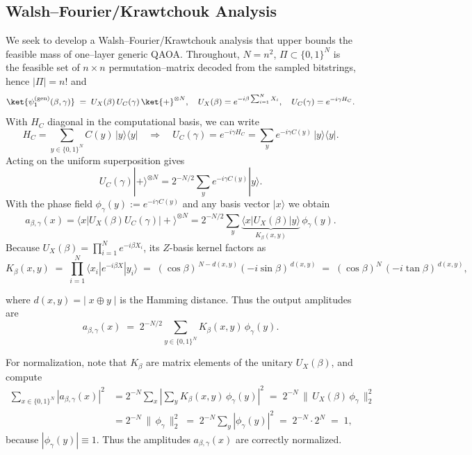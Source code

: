 \documentclass[a4paper,onecolumn,11pt,unpublished]{quantumarticle}
\theoremstyle{remark}
\begin{document}
\subsection{Walsh–Fourier/Krawtchouk Analysis}
We seek to develop a Walsh–Fourier/Krawtchouk analysis that upper bounds the feasible mass of one–layer generic QAOA. Throughout, $N=n^2$, $\Pi\subset\{0,1\}^N$ is the feasible set of $n\times n$ permutation–matrix decoded from the sampled bitstrings, hence $|\Pi|=n!$ and 
\[
  \ket{\psi_1^{\mathrm{(gen)}}(\beta,\gamma)}
  \;=\; U_X(\beta)\,U_C(\gamma)\,\ket{+}^{\otimes N},
  \quad
  U_X(\beta) = e^{-i\beta\sum_{i=1}^N X_i},\quad
  U_C(\gamma)=e^{-i\gamma H_C}.
\]
With $H_C$ diagonal in the computational basis, we can write
\[
  H_C=\sum_{y\in\{0,1\}^N} C(y)\,|y\rangle\!\langle y|
  \quad\Rightarrow\quad
  U_C(\gamma)=e^{-i\gamma H_C}
  =\sum_{y} e^{-i\gamma C(y)}\,|y\rangle\!\langle y|.
\]
Acting on the uniform superposition gives
\[
  U_C(\gamma)|+\rangle^{\otimes N}
  =2^{-N/2}\sum_{y} e^{-i\gamma C(y)} |y\rangle.
\]
With the phase field $\phi_\gamma(y):=e^{-i\gamma C(y)}$  and any basis vector $|x\rangle$ we obtain
\[
  a_{\beta,\gamma}(x)
  =\langle x|U_X(\beta)U_C(\gamma)|+\rangle^{\otimes N}
  =2^{-N/2}\sum_{y} \underbrace{\langle x|U_X(\beta)|y\rangle}_{K_\beta(x,y)}\,\phi_\gamma(y).
\]
Because $U_X(\beta)=\prod_{i=1}^N e^{-i\beta X_i}$, its $Z$-basis kernel factors as
\begin{equation}
\label{eq:kb}
  K_\beta(x,y)
  \;=\; \prod_{i=1}^N \langle x_i|e^{-i\beta X}|y_i\rangle
  \;=\; (\cos\beta)^{\,N-d(x,y)}(-i\sin\beta)^{\,d(x,y)}
  \;=\; (\cos\beta)^{N}\,(-i\tan\beta)^{\,d(x,y)},
\end{equation}

where $d(x,y)=|\;x\oplus y\;|$ is the Hamming distance.  Thus the output amplitudes are
\begin{equation}
\label{eq:prob_def}
  a_{\beta,\gamma}(x)
  \;=\; 2^{-N/2}\sum_{y\in\{0,1\}^N} K_\beta(x,y)\,\phi_\gamma(y).
\end{equation}

For normalization, note that $K_\beta$ are matrix elements of the unitary $U_X(\beta)$, and compute
\begin{align}
  \sum_{x\in\{0,1\}^N} |a_{\beta,\gamma}(x)|^2
  &= 2^{-N}\sum_{x}\left|\sum_{y} K_\beta(x,y)\,\phi_\gamma(y)\right|^2
   \;=\; 2^{-N}\,\|\,U_X(\beta)\,\phi_\gamma\,\|_2^2 \\
  &= 2^{-N}\,\|\,\phi_\gamma\,\|_2^2
   \;=\; 2^{-N}\sum_{y} |\phi_\gamma(y)|^2
   \;=\; 2^{-N}\cdot 2^N \;=\; 1,
\end{align}
because $|\phi_\gamma(y)|\equiv 1$. Thus the amplitudes $a_{\beta,\gamma}(x)$ are correctly normalized.
\end{document}
